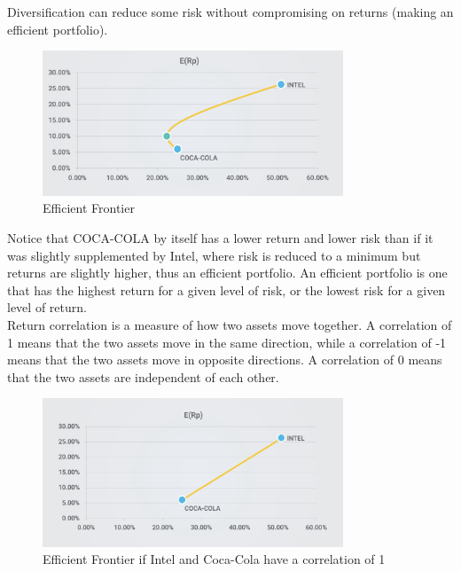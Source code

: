 Diversification can reduce some risk without compromising on returns (making an efficient portfolio). 

\begin{figure}[H]
    \centering
    \includegraphics[width=0.8\textwidth]{img/6.2.1.png}
    \caption{Efficient Frontier}
    \label{fig:efficient_frontier}    
\end{figure}

Notice that COCA-COLA by itself has a lower return and lower risk than if it was slightly supplemented by Intel, where risk is reduced to a minimum but returns are slightly higher, thus an efficient portfolio. An efficient portfolio is one that has the highest return for a given level of risk, or the lowest risk for a given level of return.\\

Return correlation is a measure of how two assets move together. A correlation of 1 means that the two assets move in the same direction, while a correlation of -1 means that the two assets move in opposite directions. A correlation of 0 means that the two assets are independent of each other.\\

\begin{figure}[H]
    \centering
    \includegraphics[width=0.8\textwidth]{img/6.2.2.png}
    \caption{Efficient Frontier if Intel and Coca-Cola have a correlation of 1}
    \label{fig:efficient_frontier_2}    
\end{figure}

